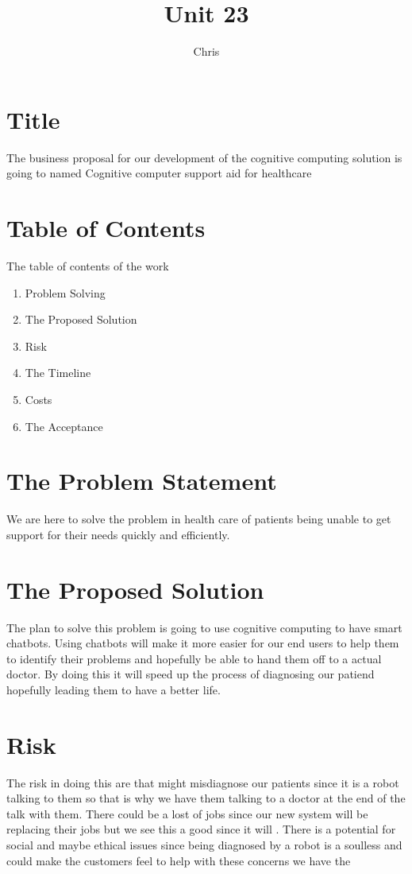 \documentclass{article}
\title{Unit 23}
\author{Chris}
\date{}
\begin{document}
\section{Title}
The business proposal for our development of the cognitive computing solution is going to named 
Cognitive computer support aid for healthcare

\section{Table of Contents}
The table of contents of the work
\begin{enumerate}
	\item	Problem Solving
	\item	The Proposed Solution
	\item 	Risk
	\item The Timeline
	\item Costs
	\item The Acceptance
\end{enumerate}

\section{The Problem Statement}
We are here to solve the problem in health care of patients being unable to get support for their needs quickly and efficiently.

\section{The Proposed Solution}
The plan to solve this problem is going to use cognitive computing to have smart chatbots. Using chatbots will make it more easier for our end users to help them to identify their problems and hopefully be able to hand them off to a actual doctor. By doing this it will speed up the process of diagnosing our patiend hopefully leading them to have a better life.

\section{Risk}
The risk in doing this are that might misdiagnose our patients since it is a robot talking to them so that is why we have them talking to a doctor at the end of the talk with them. There could be a lost of jobs since our new system will be replacing their jobs but we see this a good since it will   . 
There is a potential for social and maybe ethical issues since being diagnosed by a robot is a soulless and could make the customers feel to help with these concerns we have the 
\end{document}
